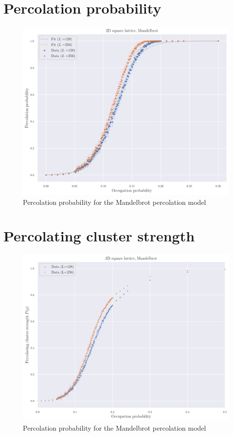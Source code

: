 \section{Percolation probability}


\begin{figure}[H]
  \includegraphics[width=\linewidth]{Images/simm_perc_prob_2.png}
  \caption{Percolation probability for the Mandelbrot percolation model}
  \label{fig:simm_perc_prob_2}
\end{figure}

\section{Percolating cluster strength}


\begin{figure}[H]
  \includegraphics[width=\linewidth]{Images/simm_perc_clust_strength_1.png}
  \caption{Percolation probability for the Mandelbrot percolation model}
  \label{fig:simm_perc_clust_strength_1}
\end{figure}


